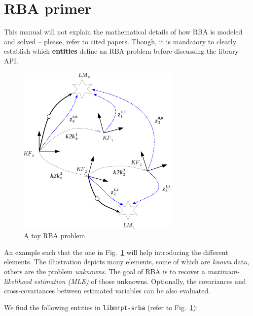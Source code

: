 \documentclass[a4paper,11pt]{article}
\begin{document}
\newpage
\section{RBA primer}
\label{sect:rba_primer}

This manual will not explain the mathematical details of how RBA is modeled and solved -- please, refer to cited papers.
Though, it is mandatory to clearly establish which \textbf{entities} define an RBA problem before discussing the library API.

\begin{figure}[h]
\centering
\includegraphics[width=0.7\textwidth]{imgs/srba_toy_problem.pdf} 
\caption{A toy RBA problem.}
\label{fig:rba.entities}
\end{figure}

An example such that the one in Fig.~\ref{fig:rba.entities} will help introducing the different elements.
The illustration depicts many elements, some of which are \emph{known} data, others are the problem \emph{unknowns}. 
The goal of RBA is to recover a \emph{maximum-likelihood estimation (MLE)} of those unknowns. Optionally, the covariances and 
cross-covariances between estimated variables can be also evaluated.

We find the following entities in \texttt{libmrpt-srba} (refer to Fig.~\ref{fig:rba.entities}):
\end{document}
